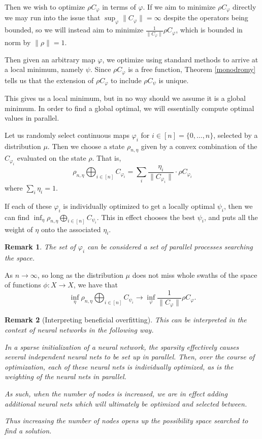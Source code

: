 \documentclass[12pt]{amsart}
\newtheorem{remark}{Remark}[theorem]
\theoremstyle{definition}
\numberwithin{equation}{section}
\begin{document}
Then we wish to optimize $\rho C_\varphi$ in terms of $\varphi$. If we aim to minimize $\rho C_\varphi$ directly we may run into the issue that $\sup_\varphi \|C_\varphi\| =\infty$ despite the operators being bounded, so we will instead aim to minimize $\frac{1}{\|C_\varphi\|}\rho C_\varphi$, which is bounded in norm by $\|\rho\| =1$. 

Then given an arbitrary map $\varphi$, we optimize using standard methods to arrive at a local minimum, namely $\psi$. Since $\rho C_\varphi$ is a free function, Theorem \ref{monodromy} tells us that the extension of $\rho C_\varphi$ to include $\rho C_\psi$ is unique. 

This gives us a local minimum, but in no way should we assume it is a global minimum. In order to find a global optimal, we will essentially compute optimal values in parallel. 

Let us randomly select continuous maps $\varphi_i$ for $i\in [n]=\{0, \dots, n\}$, selected by a distribution $\mu$. Then we choose a state $\rho_{n,\eta}$  given by a convex combination of the $C_{\varphi_i}$ evaluated on the state $\rho$. That is, 
\begin{equation}
    \rho_{n, \eta}\bigoplus_{i\in [n]}C_{\varphi_i} = \sum_i\frac{\eta_i}{\|C_{\varphi_i}\|}\cdot\rho C_{\varphi_i}
\end{equation}
where $\sum_i\eta_i=1$. 

If each of these $\varphi_i$ is individually optimized to get a locally optimal $\psi_i$, then we can find $\inf_\eta\rho_{n,\eta}\bigoplus_{i\in [n]}C_{\psi_i}$. This in effect chooses the best $\psi_i$, and puts all the weight of $\eta$ onto the associated $\eta_i$. 

\begin{remark}
    The set of $\varphi_i$ can be considered a set of parallel processes searching the space. 
\end{remark}

As $n\rightarrow \infty$, so long as the distribution $\mu$ does not miss whole swaths of the space of functions $\phi : X\rightarrow X$, we have that \[ \inf_\eta\rho_{n,\eta}\bigoplus_{i\in [n]}C_{\psi_i} \rightarrow  \inf_\varphi\frac{1}{\|C_\varphi\|}\rho C_\varphi.\]


\begin{remark}[Interpreting beneficial overfitting]
    This can be interpreted in the context of neural networks in the following way. 
    
    In a sparse initialization of a neural network, the sparsity effectively causes several independent neural nets to be set up in parallel. Then, over the course of optimization, each of these neural nets is individually optimized, as is the weighting of the neural nets in parallel. 

    As such, when the number of nodes is increased, we are in effect adding additional neural nets which will ultimately be optimized and selected between. 

    Thus increasing the number of nodes opens up the possibility space searched to find a solution.
\end{remark}
\end{document}
